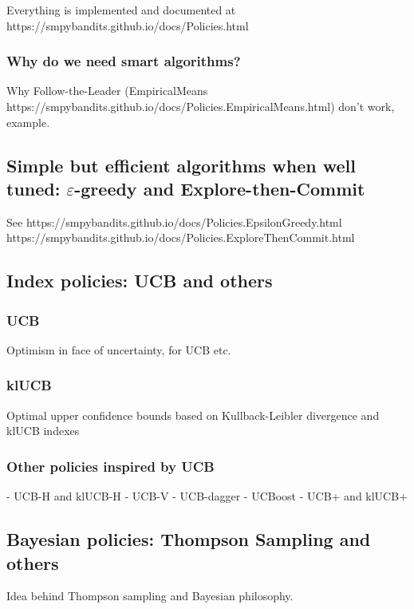 Everything is implemented and documented at
https://smpybandits.github.io/docs/Policies.html


\subsubsection{Why do we need smart algorithms?}
Why Follow-the-Leader (EmpiricalMeans https://smpybandits.github.io/docs/Policies.EmpiricalMeans.html) don't work, example.

\subsection{Simple but efficient algorithms when well tuned: $\varepsilon$-greedy and Explore-then-Commit}

See
https://smpybandits.github.io/docs/Policies.EpsilonGreedy.html
https://smpybandits.github.io/docs/Policies.ExploreThenCommit.html


\subsection{Index policies: UCB and others}

\subsubsection{UCB}
Optimism in face of uncertainty, for UCB etc.


\subsubsection{klUCB}
Optimal upper confidence bounds based on Kullback-Leibler divergence and klUCB indexes

\subsubsection{Other policies inspired by UCB}

- UCB-H and klUCB-H
- UCB-V
- UCB-dagger
- UCBoost
- UCB+ and klUCB+


\subsection{Bayesian policies: Thompson Sampling and others}

Idea behind Thompson sampling and Bayesian philosophy.

